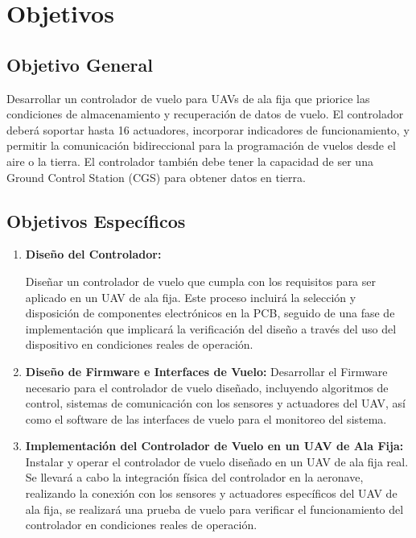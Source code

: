 \section{Objetivos}

\subsection{Objetivo General}


Desarrollar un controlador de vuelo para UAVs de ala fija que priorice las condiciones de almacenamiento y recuperación de datos de vuelo. El controlador deberá soportar hasta 16 actuadores, incorporar indicadores de funcionamiento, y permitir la comunicación bidireccional para la programación de vuelos desde el aire o la tierra. El controlador también debe tener la capacidad de ser una Ground Control Station (CGS) para obtener datos en tierra.


\subsection{Objetivos Específicos}

\begin{enumerate}


\item \textbf{Diseño del Controlador:}

Diseñar un controlador de vuelo que cumpla con los requisitos para ser aplicado en un UAV de ala fija. Este proceso incluirá la selección y disposición de componentes electrónicos en la PCB, seguido de una fase de implementación que implicará la verificación del diseño a través del uso del dispositivo en condiciones reales de operación. 
\\
\item \textbf{Diseño de Firmware e Interfaces de Vuelo:}
    Desarrollar el Firmware necesario para el controlador de vuelo diseñado, incluyendo algoritmos de control, sistemas de comunicación con los sensores y actuadores del UAV, así como el software de las interfaces de vuelo para el monitoreo del sistema.
\\
\item \textbf{Implementación del Controlador de Vuelo en un UAV  de Ala Fija:}
Instalar y operar el controlador de vuelo diseñado en un UAV de ala fija real. Se llevará a cabo la integración física del controlador en la aeronave, realizando la conexión con los sensores y actuadores específicos del UAV de ala fija, se realizará una prueba de vuelo para verificar el funcionamiento del controlador en condiciones reales de operación.

\end{enumerate}
